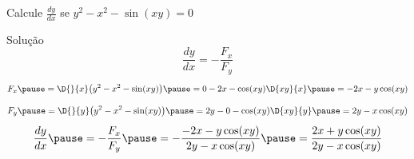 \begin{question}
  Calcule \(\frac{dy}{dx}\) se \(y^2-x^2-\sin(xy) = 0\)
\end{question}

\begin{resolution}{Solução}
  \[
    \frac{dy}{dx} = -\frac{F_x}{F_y}
  \]
  \pause
  \[
    F_x
    \pause
    = \D{}{x}\big(y^2-x^2-\sin(xy)\big)
    \pause
    = 0 - 2x - \cos(xy)\D{xy}{x}
    \pause
    = - 2x - y\cos(xy)
  \]
  \pause
  \[
    F_y
    \pause
    = \D{}{y}\big(y^2-x^2-\sin(xy)\big)
    \pause
    = 2y - 0 - \cos(xy)\D{xy}{y}
    \pause
    = 2y - x\cos(xy)
  \]
  \pause
  \[
    \frac{dy}{dx}
    \pause
    = -\frac{F_x}{F_y}
    \pause
    = -\frac{- 2x - y\cos(xy)}{2y - x\cos(xy)}
    \pause
    = \frac{2x + y\cos(xy)}{2y - x\cos(xy)}
  \]
\end{resolution}

